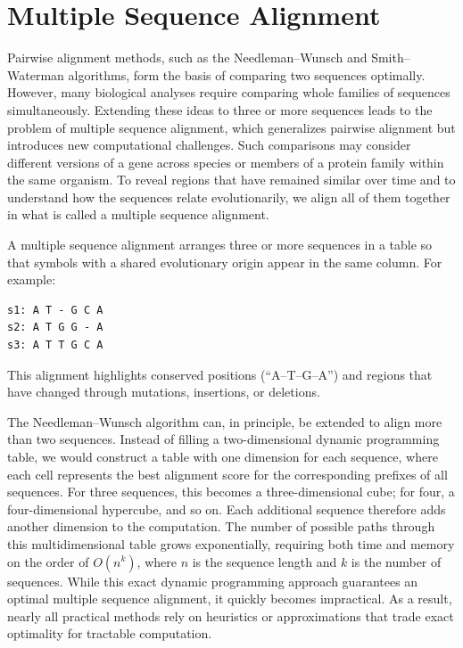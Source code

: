 \section{Multiple Sequence Alignment}

Pairwise alignment methods, such as the Needleman–Wunsch and Smith–Waterman algorithms, form the basis of comparing two sequences optimally. However, many biological analyses require comparing whole families of sequences simultaneously. Extending these ideas to three or more sequences leads to the problem of multiple sequence alignment, which generalizes pairwise alignment but introduces new computational challenges. Such comparisons may consider different versions of a gene across species or members of a protein family within the same organism. To reveal regions that have remained similar over time and to understand how the sequences relate evolutionarily, we align all of them together in what is called a multiple sequence alignment. 

A multiple sequence alignment arranges three or more sequences in a table so that symbols with a shared evolutionary origin appear in the same column. For example:
%
\begin{verbatim}
s1: A T - G C A
s2: A T G G - A
s3: A T T G C A
\end{verbatim}
%
This alignment highlights conserved positions (“A–T–G–A”) and regions that have changed through mutations, insertions, or deletions. 

The Needleman--Wunsch algorithm can, in principle, be extended to align more than two sequences. Instead of filling a two-dimensional dynamic programming table, we would construct a table with one dimension for each sequence, where each cell represents the best alignment score for the corresponding prefixes of all sequences. For three sequences, this becomes a three-dimensional cube; for four, a four-dimensional hypercube, and so on. Each additional sequence therefore adds another dimension to the computation. The number of possible paths through this multidimensional table grows exponentially, requiring both time and memory on the order of $O(n^k)$, where $n$ is the sequence length and $k$ is the number of sequences. While this exact dynamic programming approach guarantees an optimal multiple sequence alignment, it quickly becomes impractical. As a result, nearly all practical methods rely on heuristics or approximations that trade exact optimality for tractable computation.

